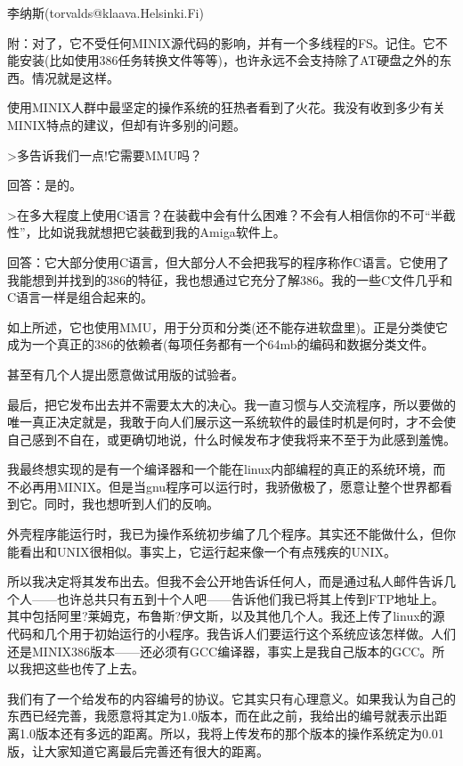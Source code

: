 李纳斯(torvalds@klaava.Helsinki.Fi)

附：对了，它不受任何MINIX源代码的影响，并有一个多线程的FS。记住。它不能安装(比如使用386任务转换文件等等)，也许永远不会支持除了AT硬盘之外的东西。情况就是这样。

 

使用MINIX人群中最坚定的操作系统的狂热者看到了火花。我没有收到多少有关MINIX特点的建议，但却有许多别的问题。

 

>多告诉我们一点!它需要MMU吗？

回答：是的。

 

>在多大程度上使用C语言？在装截中会有什么困难？不会有人相信你的不可“半截性”，比如说我就想把它装截到我的Amiga软件上。

回答：它大部分使用C语言，但大部分人不会把我写的程序称作C语言。它使用了我能想到并找到的386的特征，我也想通过它充分了解386。我的一些C文件几乎和C语言一样是组合起来的。

 

如上所述，它也使用MMU，用于分页和分类(还不能存进软盘里)。正是分类使它成为一个真正的386的依赖者(每项任务都有一个64mb的编码和数据分类文件。

甚至有几个人提出愿意做试用版的试验者。

最后，把它发布出去并不需要太大的决心。我一直习惯与人交流程序，所以要做的唯一真正决定就是，我敢于向人们展示这一系统软件的最佳时机是何时，才不会使自己感到不自在，或更确切地说，什么时候发布才使我将来不至于为此感到羞愧。

我最终想实现的是有一个编译器和一个能在linux内部编程的真正的系统环境，而不必再用MINIX。但是当gnu程序可以运行时，我骄傲极了，愿意让整个世界都看到它。同时，我也想听到人们的反响。

外壳程序能运行时，我已为操作系统初步编了几个程序。其实还不能做什么，但你能看出和UNIX很相似。事实上，它运行起来像一个有点残疾的UNIX。

所以我决定将其发布出去。但我不会公开地告诉任何人，而是通过私人邮件告诉几个人——也许总共只有五到十个人吧——告诉他们我已将其上传到FTP地址上。其中包括阿里?莱姆克，布鲁斯?伊文斯，以及其他几个人。我还上传了linux的源代码和几个用于初始运行的小程序。我告诉人们要运行这个系统应该怎样做。人们还是MINIX386版本——还必须有GCC编译器，事实上是我自己版本的GCC。所以我把这些也传了上去。

我们有了一个给发布的内容编号的协议。它其实只有心理意义。如果我认为自己的东西已经完善，我愿意将其定为1.0版本，而在此之前，我给出的编号就表示出距离1.0版本还有多远的距离。所以，我将上传发布的那个版本的操作系统定为0.01版，让大家知道它离最后完善还有很大的距离。

